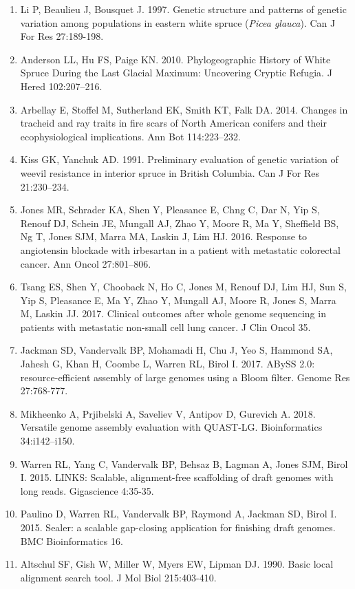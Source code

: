 \documentclass[titlepage,11pt, oneside]{article}   	%
\begin{document}
\begin{enumerate}
\item Li P, Beaulieu J, Bousquet J. 1997. Genetic structure and patterns of genetic variation among populations in eastern white spruce (\textit{Picea glauca}). Can J For Res 27:189-198.
\item Anderson LL, Hu FS, Paige KN. 2010. Phylogeographic History of White Spruce During the Last Glacial Maximum: Uncovering Cryptic Refugia. J Hered 102:207–216.
\item Arbellay E, Stoffel M, Sutherland EK, Smith KT, Falk DA. 2014. Changes in tracheid and ray traits in fire scars of North American conifers and their ecophysiological implications. Ann Bot 114:223–232.
\item Kiss GK, Yanchuk AD. 1991. Preliminary evaluation of genetic variation of weevil resistance in interior spruce in British Columbia. Can J For Res 21:230–234.
\item Jones MR, Schrader KA, Shen Y, Pleasance E, Chng C, Dar N, Yip S, Renouf DJ, Schein JE, Mungall AJ, Zhao Y, Moore R, Ma Y, Sheffield BS, Ng T, Jones SJM, Marra MA, Laskin J, Lim HJ. 2016. Response to angiotensin blockade with irbesartan in a patient with metastatic colorectal cancer. Ann Oncol 27:801–806.
\item Tsang ES, Shen Y, Chooback N, Ho C, Jones M, Renouf DJ, Lim HJ, Sun S, Yip S, Pleasance E, Ma Y, Zhao Y, Mungall AJ, Moore R, Jones S, Marra M, Laskin JJ. 2017. Clinical outcomes after whole genome sequencing in patients with metastatic non-small cell lung cancer. J Clin Oncol 35.
\item Jackman SD, Vandervalk BP, Mohamadi H, Chu J, Yeo S, Hammond SA, Jahesh G, Khan H, Coombe L, Warren RL, Birol I. 2017. ABySS 2.0: resource-efficient assembly of large 
genomes using a Bloom filter. Genome Res 27:768-777.
\item Mikheenko A, Prjibelski A, Saveliev V, Antipov D, Gurevich A. 2018. Versatile genome assembly evaluation with QUAST-LG. Bioinformatics 34:i142–i150.
\item Warren RL, Yang C, Vandervalk BP, Behsaz B, Lagman A, Jones SJM, Birol I. 2015. LINKS: Scalable, alignment-free scaffolding of draft genomes with long reads. Gigascience 4:35-35.
\item Paulino D, Warren RL, Vandervalk BP, Raymond A, Jackman SD, Birol I. 2015. Sealer: a scalable gap-closing application for finishing draft genomes. BMC Bioinformatics 16.
\item Altschul SF, Gish W, Miller W, Myers EW, Lipman DJ. 1990. Basic local alignment search tool. J Mol Biol 215:403-410.

\end{enumerate}
\end{document}
